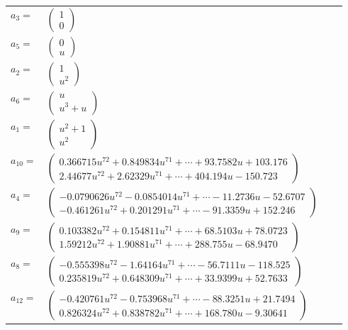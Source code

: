 \documentclass[1p]{elsarticle_modified}
\theoremstyle{definition}
\begin{document}
\begin{tabular}{m{7pt} m{180pt} m{7pt} m{180pt} }
\flushright $a_{3}=$&$\begin{pmatrix}1\\0\end{pmatrix}$ \\
\flushright $a_{5}=$&$\begin{pmatrix}0\\u\end{pmatrix}$ \\
\flushright $a_{2}=$&$\begin{pmatrix}1\\u^2\end{pmatrix}$ \\
\flushright $a_{6}=$&$\begin{pmatrix}u\\u^3+u\end{pmatrix}$ \\
\flushright $a_{1}=$&$\begin{pmatrix}u^2+1\\u^2\end{pmatrix}$ \\
\flushright $a_{10}=$&$\begin{pmatrix}0.366715 u^{72}+0.849834 u^{71}+\cdots+93.7582 u+103.176\\2.44677 u^{72}+2.62329 u^{71}+\cdots+404.194 u-150.723\end{pmatrix}$ \\
\flushright $a_{4}=$&$\begin{pmatrix}-0.0790626 u^{72}-0.0854014 u^{71}+\cdots-11.2736 u-52.6707\\-0.461261 u^{72}+0.201291 u^{71}+\cdots-91.3359 u+152.246\end{pmatrix}$ \\
\flushright $a_{9}=$&$\begin{pmatrix}0.103382 u^{72}+0.154811 u^{71}+\cdots+68.5103 u+78.0723\\1.59212 u^{72}+1.90881 u^{71}+\cdots+288.755 u-68.9470\end{pmatrix}$ \\
\flushright $a_{8}=$&$\begin{pmatrix}-0.555398 u^{72}-1.64164 u^{71}+\cdots-56.7111 u-118.525\\0.235819 u^{72}+0.648309 u^{71}+\cdots+33.9399 u+52.7633\end{pmatrix}$ \\
\flushright $a_{12}=$&$\begin{pmatrix}-0.420761 u^{72}-0.753968 u^{71}+\cdots-88.3251 u+21.7494\\0.826324 u^{72}+0.838782 u^{71}+\cdots+168.780 u-9.30641\end{pmatrix}$ \\

\end{tabular}
\end{document}
